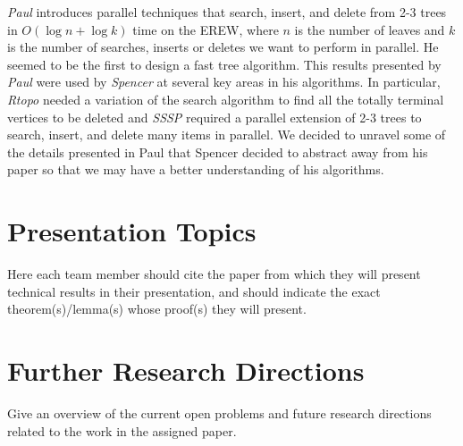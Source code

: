 \documentclass[paper=a4, fontsize=11pt]{scrartcl} %
\numberwithin{equation}{section} %
\numberwithin{figure}{section} %
\numberwithin{table}{section} %
\begin{document}
\textit{Paul\cite{P83}} introduces parallel techniques that search, insert, and delete from 2-3 trees in $O(\log{n} + \log{k})$ time on the EREW, where $n$ is the number of leaves and $k$ is the number of searches, inserts or deletes we want to perform in parallel. He seemed to be the first to design a fast tree algorithm. This results presented by \textit{Paul\cite{P83}} were used by \textit{Spencer\cite{S97}} at several key areas in his algorithms. In particular, \textit{Rtopo} needed a variation of the search algorithm to find all the totally terminal vertices to be deleted and \textit{SSSP} required a parallel extension of 2-3 trees to search, insert, and delete many items in parallel. We decided to unravel some of the details presented in Paul that Spencer decided to abstract away from his paper so that we may have a better understanding of his algorithms.



\section{Presentation Topics}

Here each team member should cite the paper from which they will present technical results in their
presentation, and should indicate the exact theorem(s)/lemma(s) whose proof(s) they will present.


\section{Further Research Directions}
Give an overview of the current open problems and future research directions related to the work in the assigned paper.






\end{document}
